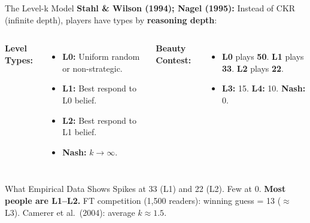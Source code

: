 \documentclass[aspectratio=169]{beamer}
\begin{document}
\begin{frame}{The Level-k Model}
\textcolor{beblue}{\textbf{Stahl \& Wilson (1994); Nagel (1995):}} Instead of CKR (infinite depth), players have types by \textbf{reasoning depth}:
\begin{columns}
\textcolor{beblue}{\textbf{Level Types:}}
\begin{itemize}\small
  \item \textbf{L0:} Uniform random or non-strategic.
  \item \textbf{L1:} Best respond to L0 belief.
  \item \textbf{L2:} Best respond to L1 belief.
  \item \textbf{Nash:} $k \to \infty$.
\end{itemize}
\textcolor{beblue}{\textbf{Beauty Contest:}}
\begin{itemize}\small
  \item \textbf{L0} plays \textbf{50}. \textbf{L1} plays \textbf{33}. \textbf{L2} plays \textbf{22}.
  \item \textbf{L3:} 15. \textbf{L4:} 10. \textbf{Nash:} 0.
\end{itemize}
\end{columns}
\begin{alertblock}{What Empirical Data Shows}
Spikes at 33 (L1) and 22 (L2). Few at 0. \textbf{Most people are L1--L2.} FT competition (1,500 readers): winning guess = 13 ($\approx$L3). Camerer et al.\ (2004): average $k \approx 1.5$.
\end{alertblock}
\end{frame}
\end{document}
